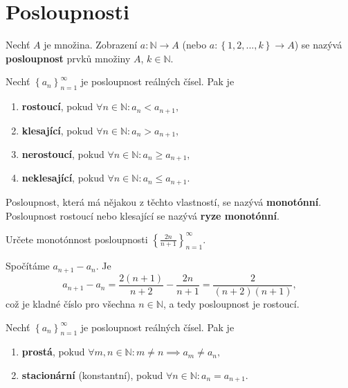 \section{Posloupnosti}
\begin{definition}
Nechť $A$ je množina. Zobrazení $a\colon\mathbb N\to A$ (nebo $a\colon\left \{ 1,2,...,k \right \} \to A$)
se nazývá \textbf{posloupnost} prvků množiny $A$, $k\in \mathbb N.$
\end{definition}

\begin{definition}
Nechť $\left \{ a_n \right \}_{n=1}^\infty $ je posloupnost reálných čísel. Pak je
\begin{enumerate}[$i.$]
\item \textbf{rostoucí}, pokud $\forall n \in \mathbb N\colon a_n< a_{n+1},$
\item \textbf{klesající}, pokud $\forall n \in \mathbb N\colon a_n> a_{n+1},$
\item \textbf{nerostoucí}, pokud $\forall n \in \mathbb N\colon a_n\geq a_{n+1},$
\item \textbf{neklesající}, pokud $\forall n \in \mathbb N\colon a_n\leq a_{n+1}.$
\end{enumerate}
Posloupnost, která má nějakou z těchto vlastností, se nazývá \textbf{monotónní}.
Posloupnost rostoucí nebo klesající se nazývá \textbf{ryze monotónní}.
\end{definition}

\begin{priklad}
Určete monotónnost posloupnosti $\left \{ \frac{2n}{n+1} \right \}_{n=1}^\infty $.
\end{priklad}

\begin{reseni}
Spočítáme $a_{n+1}-a_n$. Je
$$
    a_{n+1}-a_n = \frac{2(n+1)}{n+2} - \frac{2n}{n+1} = \frac{2}{(n+2)(n+1)},
$$
což je kladné číslo pro všechna $n \in \mathbb N $, a tedy posloupnost je rostoucí.
\end{reseni}

\begin{definition}
    Nechť $\left \{ a_n \right \}_{n=1}^\infty $ je posloupnost reálných čísel. Pak je
    \begin{enumerate}[$i.$]
    \item \textbf{prostá}, pokud $\forall m,n\in \mathbb N\colon m\ne n \implies a_m\ne a_n,$
   	\item \textbf{stacionární} (konstantní), pokud $\forall n \in \mathbb N\colon a_n = a_{n+1}.$
    \end{enumerate}
\end{definition}

